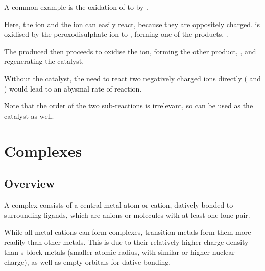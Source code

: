 				A common example is the oxidation of  to  by .


				Here, the  ion and the  ion can easily react, because they are oppositely charged.  is
				oxidised by the peroxodisulphate ion to , forming one of the products, .

				The  produced then proceeds to oxidise the  ion, forming the other product, , and regenerating
				the  catalyst.

				Without the catalyst, the need to react two negatively charged ions directly ( and ) would lead to an
				abysmal rate of reaction.

				Note that the order of the two sub-reactions is irrelevant, so  can be used as the catalyst as well.







	\section{Complexes}

		\subsection{Overview}

			A complex consists of a central metal atom or cation, datively-bonded to surrounding ligands, which are anions or molecules with
			at least one lone pair.

			While all metal cations can form complexes, transition metals form them more readily than other metals. This is due to their
			relatively higher charge density than s-block metals (smaller atomic radius, with similar or higher nuclear charge), as well
			as empty orbitals for dative bonding.

